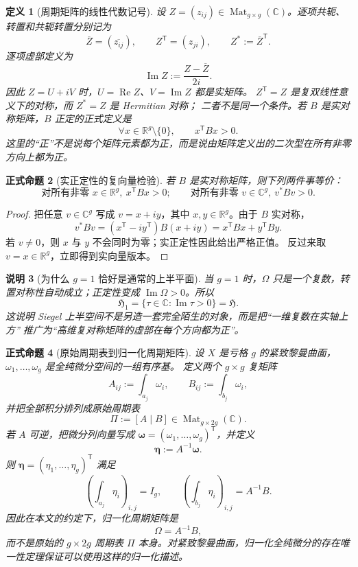 \documentclass[UTF8,fontset=none,a4paper,11pt]{ctexart}
\theoremstyle{foundation-definition}
\newtheorem{definition}{定义}[section]
\theoremstyle{foundation-theorem}
\theoremstyle{foundation-proposition}
\newtheorem{proposition}[definition]{正式命题}
\theoremstyle{foundation-example}
\theoremstyle{foundation-remark}
\newtheorem{remark}[definition]{说明}
\theoremstyle{foundation-theorem}
\begin{document}
\begin{definition}[周期矩阵的线性代数记号]\label{def:complex-matrix-components}
设 \(Z=(z_{ij})\in\operatorname{Mat}_{g\times g}(\mathbb C)\)。逐项共轭、转置和共轭转置分别记为
\[
\overline Z=(\overline{z_{ij}}),\qquad
Z^{\mathsf T}=(z_{ji}),\qquad
Z^*:=\overline Z^{\mathsf T}.
\]
逐项虚部定义为
\[
\operatorname{Im}Z:=\frac{Z-\overline Z}{2i}.
\]
因此 \(Z=U+iV\) 时，\(U=\operatorname{Re}Z\)、\(V=\operatorname{Im}Z\) 都是实矩阵。
\(Z^{\mathsf T}=Z\) 是复双线性意义下的对称，而 \(Z^*=Z\) 是 Hermitian 对称；
二者不是同一个条件。若 \(B\) 是实对称矩阵，\(B\) 正定的正式定义是
\[
\forall x\in\mathbb R^g\setminus\{0\},\qquad
x^{\mathsf T}Bx>0.
\]
这里的“正”不是说每个矩阵元素都为正，而是说由矩阵定义出的二次型在所有非零方向上都为正。
\end{definition}

\begin{proposition}[实正定性的复向量检验]\label{prop:positive-definite-complex-test}
若 \(B\) 是实对称矩阵，则下列两件事等价：
\[
\text{对所有非零 }x\in\mathbb R^g,\ x^{\mathsf T}Bx>0;
\qquad
\text{对所有非零 }v\in\mathbb C^g,\ v^*Bv>0.
\]
\end{proposition}

\begin{proof}
把任意 \(v\in\mathbb C^g\) 写成 \(v=x+iy\)，其中 \(x,y\in\mathbb R^g\)。由于 \(B\) 实对称，
\[
v^*Bv=(x^{\mathsf T}-iy^{\mathsf T})B(x+iy)
=x^{\mathsf T}Bx+y^{\mathsf T}By.
\]
若 \(v\neq0\)，则 \(x\) 与 \(y\) 不会同时为零；实正定性因此给出严格正值。
反过来取 \(v=x\in\mathbb R^g\)，立即得到实向量版本。
\end{proof}

\begin{remark}[为什么 \(g=1\) 恰好是通常的上半平面]
当 \(g=1\) 时，\(\Omega\) 只是一个复数，转置对称性自动成立；正定性变成
\(\operatorname{Im}\Omega>0\)。所以
\[
\mathfrak H_1=\{\tau\in\mathbb C:\operatorname{Im}\tau>0\}=\mathfrak H.
\]
这说明 Siegel 上半空间不是另造一套完全陌生的对象，而是把“一维复数在实轴上方”
推广为“高维复对称矩阵的虚部在每个方向都为正”。
\end{remark}

\begin{proposition}[原始周期表到归一化周期矩阵]\label{prop:period-table-normalization}
设 \(X\) 是亏格 \(g\) 的紧致黎曼曲面，\(\omega_1,\ldots,\omega_g\) 是全纯微分空间的一组有序基。
定义两个 \(g\times g\) 复矩阵
\[
A_{ij}:=\int_{a_j}\omega_i,\qquad
B_{ij}:=\int_{b_j}\omega_i,
\]
并把全部积分排列成原始周期表
\[
\Pi:=[A\mid B]\in\operatorname{Mat}_{g\times 2g}(\mathbb C).
\]
若 \(A\) 可逆，把微分列向量写成
\(\boldsymbol\omega=(\omega_1,\ldots,\omega_g)^{\mathsf T}\)，并定义
\[
\boldsymbol\eta:=A^{-1}\boldsymbol\omega.
\]
则 \(\boldsymbol\eta=(\eta_1,\ldots,\eta_g)^{\mathsf T}\) 满足
\[
\left(\int_{a_j}\eta_i\right)_{i,j}=I_g,\qquad
\left(\int_{b_j}\eta_i\right)_{i,j}=A^{-1}B.
\]
因此在本文的约定下，归一化周期矩阵是
\[
\Omega=A^{-1}B,
\]
而不是原始的 \(g\times2g\) 周期表 \(\Pi\) 本身。对紧致黎曼曲面，归一化全纯微分的存在唯一性定理保证可以使用这样的归一化描述。
\end{proposition}
\end{document}
